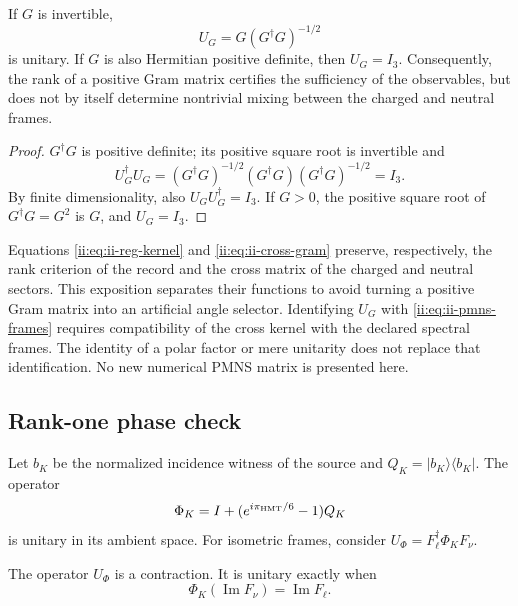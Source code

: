 \begin{proposition}
If \(G\) is invertible,
\begin{equation}
 U_G=G(G^\dagger G)^{-1/2}
 \label{ii:eq:ii-polar}
\end{equation}
is unitary. If \(G\) is also Hermitian positive definite, then \(U_G=I_3\). Consequently, the rank of a positive Gram matrix certifies the sufficiency of the observables, but does not by itself determine nontrivial mixing between the charged and neutral frames.
\end{proposition}

\begin{proof}
\(G^\dagger G\) is positive definite; its positive square root is invertible and
\[
 U_G^\dagger U_G=(G^\dagger G)^{-1/2}(G^\dagger G)
 (G^\dagger G)^{-1/2}=I_3.
\]
By finite dimensionality, also \(U_GU_G^\dagger=I_3\). If \(G>0\), the positive square root of \(G^\dagger G=G^2\) is \(G\), and \(U_G=I_3\).
\end{proof}

\begin{remark}
Equations \eqref{ii:eq:ii-reg-kernel} and \eqref{ii:eq:ii-cross-gram} preserve, respectively, the rank criterion of the record and the cross matrix of the charged and neutral sectors. This exposition separates their functions to avoid turning a positive Gram matrix into an artificial angle selector. Identifying \(U_G\) with \eqref{ii:eq:ii-pmns-frames} requires compatibility of the cross kernel with the declared spectral frames. The identity of a polar factor or mere unitarity does not replace that identification. No new numerical PMNS matrix is presented here.
\end{remark}

\subsection{Rank-one phase check}

Let \(b_K\) be the normalized incidence witness of the source and \(Q_K=|b_K\rangle\langle b_K|\). The operator
\begin{equation}
 \Phi_K=I+(e^{i\pi_{\rm HMT}/6}-1)Q_K
 \label{ii:eq:ii-rank-one-phase}
\end{equation}
is unitary in its ambient space. For isometric frames, consider \(U_\Phi=F_\ell^\dagger\Phi_KF_\nu\).

\begin{proposition}
The operator \(U_\Phi\) is a contraction. It is unitary exactly when
\begin{equation}
 \Phi_K(\operatorname{Im}F_\nu)=\operatorname{Im}F_\ell.
 \label{ii:eq:ii-phase-compatibility}
\end{equation}
\end{proposition}

